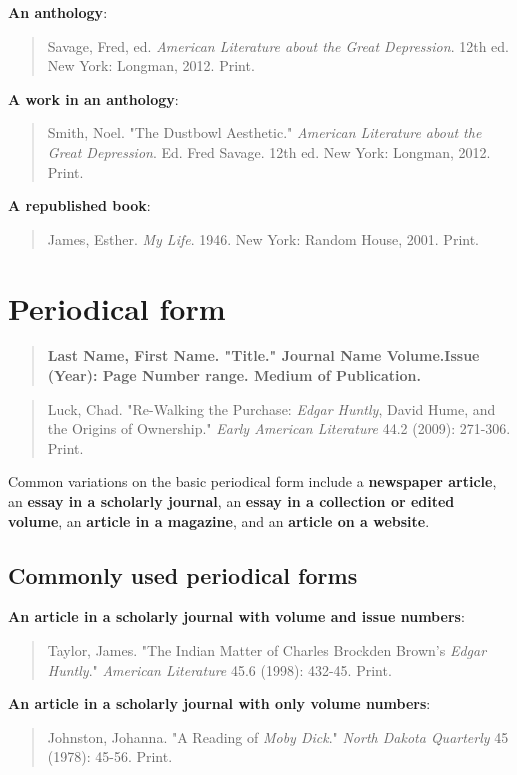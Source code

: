 \textbf{An anthology}: 
\begin{quote}
Savage, Fred, ed. \emph{American Literature about the Great Depression}. 12th  ed. 
New York: Longman, 2012. Print.
\end{quote}

\textbf{A work in an anthology}: 
\begin{quote}
Smith, Noel. "The Dustbowl Aesthetic." \emph{American Literature about the  Great 
Depression}. Ed. Fred Savage. 12th ed. New York: Longman,  2012. Print.
\end{quote}

\textbf{A republished book}: 
\begin{quote}
James, Esther. \emph{My Life}. 1946. New York: Random House, 2001. Print.
\end{quote}


\section{Periodical form}
\begin{quote}
\textbf{Last Name, First Name. "Title." Journal Name Volume.Issue  (Year): Page Number 
range. Medium of Publication.}
\end{quote}
\medskip
\medskip
\begin{quote}
Luck, Chad. "Re-Walking the Purchase: \emph{Edgar Huntly}, David Hume, and  the 
Origins of Ownership." \emph{Early American Literature} 44.2 (2009):  271-306. Print.
\end{quote}

Common variations on the basic periodical form include a \textbf{newspaper article}, 
an \textbf{essay in a scholarly journal}, an \textbf{essay in a collection or edited volume}, 
an \textbf{article in a magazine}, and an \textbf{article on a website}.

\subsection{Commonly used periodical forms}

\textbf{An article in a scholarly journal with volume and issue numbers}:
\begin{quote}
Taylor, James. "The Indian Matter of Charles Brockden Brown's \emph{Edgar  Huntly}." 
\emph{American Literature} 45.6 (1998): 432-45. Print.
\end{quote}


\textbf{An article in a scholarly journal with only volume numbers}:
\begin{quote}
Johnston, Johanna. "A Reading of \emph{Moby Dick}." \emph{North Dakota Quarterly}  
45 (1978): 45-56. Print.
\end{quote}

